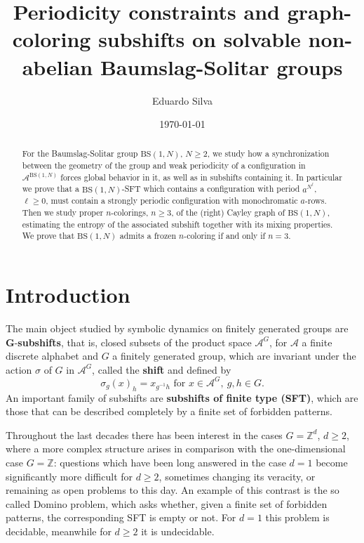 \documentclass[letterpaper,10pt]{amsart}
\title{Periodicity constraints and graph-coloring subshifts on solvable non-abelian Baumslag-Solitar groups}
\date{\today}
\author{Eduardo Silva}
\theoremstyle{plain}
\newcommand{\BS}[1][N]{\mathrm{BS}(1,#1)}
\begin{document}
	


\begin{abstract}
For the Baumslag-Solitar group $\BS$, $N\ge 2$, we study how a synchronization between the geometry of the group and weak periodicity of a configuration in $\mathcal{A}^{\BS}$ forces global behavior in it, as well as in subshifts containing it. In particular we prove that a $\BS$-SFT which contains a configuration with period $a^{N^\ell}$, $\ell\ge 0$, must contain a strongly periodic configuration with monochromatic $a$-rows. Then we study proper $n$-colorings, $n\ge 3$, of the (right) Cayley graph of $\BS$, estimating the entropy of the associated subshift together with its mixing properties. We prove that $\BS$ admits a frozen $n$-coloring if and only if $n=3$.
\end{abstract}	
\maketitle 	



	\section{Introduction}
\label{section:introduction}
 The main object studied by symbolic dynamics on finitely generated groups are $\mathbf{G}$-\textbf{subshifts}, that is, closed subsets of the product space $\mathcal{A}^G$, for $\mathcal{A}$ a finite discrete alphabet and $G$ a finitely generated group, which are invariant under the action $\sigma$ of $G$ in $\mathcal{A}^G$, called the \textbf{shift} and defined by
  $$\sigma_g(x)_h=x_{g^{-1}h}\text{ for }x\in\mathcal{A}^G,\ g,h\in G.$$
An important family of subshifts are \textbf{subshifts of finite type (SFT)}, which are those that can be described completely by a finite set of forbidden patterns.

Throughout the last decades there has been interest in the cases $G=\mathbb{Z}^d$, $d\ge 2$, where a more complex structure arises in comparison with the one-dimensional case $G=\mathbb{Z}$: questions which have been long answered in the case $d=1$ become significantly more difficult for $d\ge 2$, sometimes changing its veracity, or remaining as open problems to this day. An example of this contrast is the so called Domino problem, which asks whether, given a finite set of forbidden patterns, the corresponding SFT is empty or not. For $d=1$ this problem is decidable, meanwhile for $d\ge 2$ it is undecidable.
\end{document}
